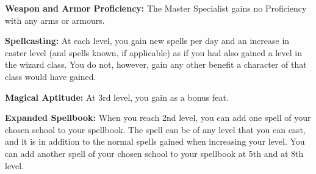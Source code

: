 \begin{extraclasstable}{}
\end{extraclasstable}

\classfeatures

\textbf{Weapon and Armor Proficiency:} The Master Specialist gains no Proficiency with any arms or armours.

\textbf{Spellcasting:} At each level, you gain new spells per day and an increase in caster level (and spells known, if applicable) as if you had also gained a level in the wizard class. You do not, however, gain any other benefit a character of that class would have gained.

\textbf{Magical Aptitude:} At 3rd level, you gain  as a bonus feat.

\textbf{Expanded Spellbook:} When you reach 2nd level, you can add one spell of your chosen school to your spellbook. The spell can be of any level that you can cast, and it is in addition to the normal spells gained when increasing your level. You can add another spell of your chosen school to your spellbook at 5th and at 8th level.

